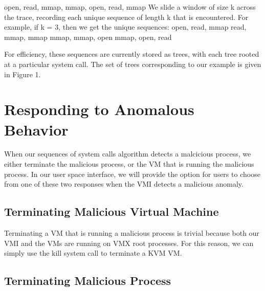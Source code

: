 \documentclass{report}
\begin{document}
\begin{spacing}{1.5}
open, read, mmap, mmap, open, read, mmap
We slide a window of size k across the trace, recording each unique sequence of length k
that is encountered. For example, if k = 3, then we get the unique sequences:
open, read, mmap
read, mmap, mmap
mmap, mmap, open
mmap, open, read


For efficiency, these sequences are currently stored as trees, with each tree rooted at a
particular system call. The set of trees corresponding to our example is given in Figure 1.









\section{Responding to Anomalous Behavior}

{\large
When our sequences of system calls algorithm detects a malcicious process, we either terminate the malicious process, or the VM that is running the malicious process. In our user space interface, we will provide the option for users to choose from one of these two responses when the VMI detects a malicious anomaly. 
\newline
}

\subsection{Terminating Malicious Virtual Machine}

{\large
Terminating a VM that is running a malicious process is trivial because both our VMI and the VMs are running on VMX root processes. For this reason, we can simply use the kill system call to terminate a KVM VM. 
\newline
}

\subsection{Terminating Malicious Process}



\end{spacing}
\end{document}
